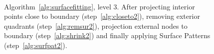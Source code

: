 \documentclass[10pt]{article}
\begin{document}
\begin{figure}[htb]
\centering
 \\
 \caption{Algorithm~\ref{alg:surfacefitting}, level 3. After projecting interior points close to boundary (step~\ref{alg:closeto2}), removing exterior quadrants (step~\ref{alg:remsur2}), projection external nodes to boundary (step~\ref{alg:shrink2}) and finally applying Surface Patterns (step~\ref{alg:surfpat2}).}
\label{fig:surfacehandling3}
\end{figure}
\end{document}
